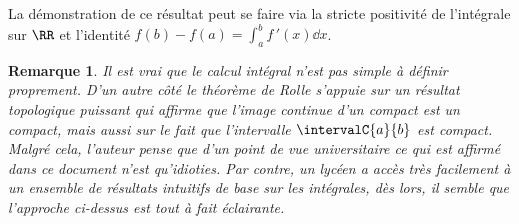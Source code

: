 \documentclass[12pt]{amsart}
\newtheorem*{remark*}{Remarque}
\begin{document}
La démonstration de ce résultat peut se faire via la stricte positivité de l'intégrale sur $\RR$ et l'identité $f(b) - f(a) = \int_a^b f\,'(x) \dd{x}$.


\begin{remark*}
	Il est vrai que le calcul intégral n'est pas simple à définir proprement.
	D'un autre côté le théorème de Rolle s'appuie sur un résultat topologique puissant qui affirme que l'image continue d'un compact est un compact, mais aussi sur le fait que l'intervalle $\intervalC{a}{b}$ est compact.
	Malgré cela, l'auteur pense que d'un point de vue universitaire ce qui est affirmé dans ce document n'est qu'idioties.
	Par contre, un lycéen a accès très facilement à un ensemble de résultats intuitifs de base sur les intégrales, dès lors,  il semble que l'approche ci-dessus est tout à fait éclairante.
\end{remark*}
\end{document}
